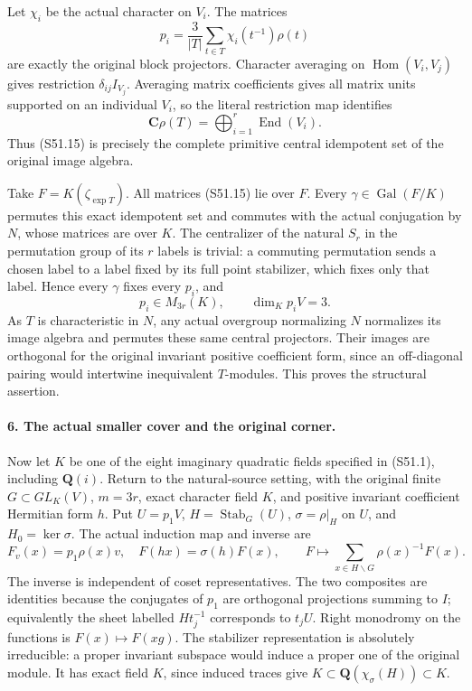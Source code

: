 Let \(\chi_i\) be the actual character on \(V_i\). The
matrices
\[
 p_i=\frac3{|T|}\sum_{t\in T}\chi_i(t^{-1})\rho(t)
                                                               \tag{S51.15}
\]
are exactly the original block projectors. Character averaging
on \(\operatorname{Hom}(V_i,V_j)\) gives restriction
\(\delta_{ij}I_{V_j}\). Averaging matrix coefficients gives
all matrix units supported on an individual \(V_i\), so the
literal restriction map identifies
\[
 \mathbf C\rho(T)=\bigoplus_{i=1}^r\operatorname{End}(V_i).
                                                               \tag{S51.16}
\]
Thus (S51.15) is precisely the complete primitive central
idempotent set of the original image algebra.

Take \(F=K(\zeta_{\exp T})\). All matrices (S51.15) lie
over \(F\). Every \(\gamma\in\operatorname{Gal}(F/K)\)
permutes this exact idempotent set and commutes with the actual
conjugation by \(N\), whose matrices are over \(K\). The
centralizer of the natural \(S_r\) in the permutation group
of its \(r\) labels is trivial: a commuting permutation
sends a chosen label to a label fixed by its full point
stabilizer, which fixes only that label. Hence every \(\gamma\)
fixes every \(p_i\), and
\[
                  p_i\in M_{3r}(K),\qquad \dim_Kp_iV=3.
                                                               \tag{S51.17}
\]
As \(T\) is characteristic in \(N\), any actual overgroup
normalizing \(N\) normalizes its image algebra and permutes
these same central projectors. Their images are orthogonal for
the original invariant positive coefficient form, since an
off-diagonal pairing would intertwine inequivalent \(T\)-modules.
This proves the structural assertion.

\paragraph{6. The actual smaller cover and the original corner.}
Now let \(K\) be one of the eight imaginary quadratic fields
specified in (S51.1), including \(\mathbf Q(i)\). Return to
the natural-source setting, with the original finite
\(G\subset GL_K(V)\), \(m=3r\), exact character field
\(K\), and positive invariant coefficient Hermitian form
\(h\). Put \(U=p_1V\), \(H=\operatorname{Stab}_G(U)\),
\(\sigma=\rho|_H\) on \(U\), and
\(H_0=\ker\sigma\). The actual induction map and inverse are
\[
 F_v(x)=p_1\rho(x)v,\quad F(hx)=\sigma(h)F(x),\qquad
 F\longmapsto\sum_{x\in H\backslash G}\rho(x)^{-1}F(x).
                                                               \tag{S51.18}
\]
The inverse is independent of coset representatives. The two
composites are identities because the conjugates of \(p_1\)
are orthogonal projections summing to \(I\); equivalently the
sheet labelled \(Ht_j^{-1}\) corresponds to \(t_jU\).
Right monodromy on the functions is \(F(x)\mapsto F(xg)\).
The stabilizer representation is absolutely irreducible: a
proper invariant subspace would induce a proper one of the
original module. It has exact field \(K\), since induced
traces give
\(K\subset\mathbf Q(\chi_\sigma(H))\subset K\).

